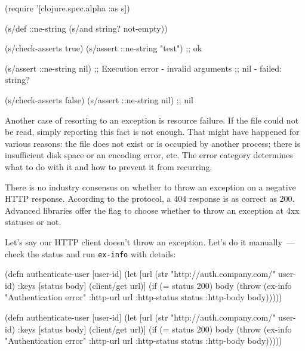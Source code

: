 \else

\begin{english}
  \begin{clojure}
(require '[clojure.spec.alpha :as s])

(s/def ::ne-string (s/and string? not-empty))

(s/check-asserts true)
(s/assert ::ne-string "test") ;; ok

(s/assert ::ne-string nil)
;; Execution error - invalid arguments
;; nil - failed: string?

(s/check-asserts false)
(s/assert ::ne-string nil) ;; nil
  \end{clojure}
\end{english}

\fi

Another case of resorting to an exception is resource failure. If the file could not be read, simply reporting this fact is not enough.
That might have happened for various reasons: the file does not exist or is occupied by another process; there is insufficient disk space or an encoding error, etc. The error category determines what to do with it and how to prevent it from recurring.


There is no industry consensus on whether to throw an exception on a negative HTTP response. According to the protocol, a 404 response is as correct as 200. Advanced libraries offer the flag to choose whether to throw an exception at 4xx statuses or not.

Let's say our HTTP client doesn't throw an exception. Let's do it manually~--- check the status and run \verb|ex-info| with details: 


\ifx\DEVICETYPE\MOBILE

\begin{english}
  \begin{clojure}
(defn authenticate-user [user-id]
  (let [url (str
              "http://auth.company.com/"
              user-id)
        {:keys [status body]}
        (client/get url)]
    (if (= status 200)
      body
      (throw (ex-info
               "Authentication error"
               {:http-url url
                :http-status status
                :http-body body})))))
  \end{clojure}
\end{english}

\else

\begin{english}
  \begin{clojure}
(defn authenticate-user [user-id]
  (let [url (str "http://auth.company.com/" user-id)
        {:keys [status body]} (client/get url)]
    (if (= status 200)
      body
      (throw (ex-info "Authentication error"
                      {:http-url url
                       :http-status status
                       :http-body body})))))
  \end{clojure}
\end{english}

